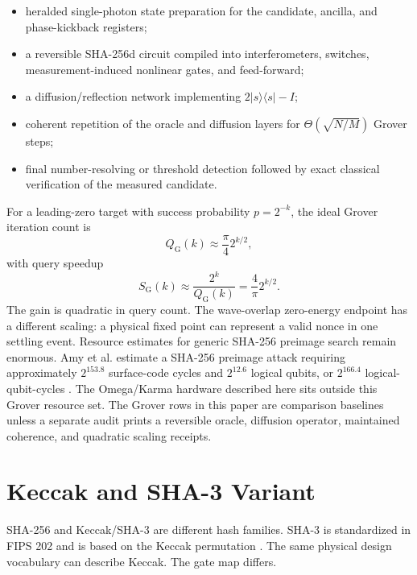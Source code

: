\documentclass[11pt]{article}
\theoremstyle{definition}
\theoremstyle{remark}
\begin{document}
\begin{itemize}
\item heralded single-photon state preparation for the candidate, ancilla, and
phase-kickback registers;
\item a reversible SHA-256d circuit compiled into interferometers, switches,
measurement-induced nonlinear gates, and feed-forward;
\item a diffusion/reflection network implementing \(2|s\rangle\langle s|-I\);
\item coherent repetition of the oracle and diffusion layers for
\(\Theta(\sqrt{N/M})\) Grover steps;
\item final number-resolving or threshold detection followed by exact classical
verification of the measured candidate.
\end{itemize}

For a leading-zero target with success probability \(p=2^{-k}\), the ideal
Grover iteration count is
\[
Q_{\mathrm{G}}(k)\approx \frac{\pi}{4}2^{k/2},
\]
with query speedup
\[
S_{\mathrm{G}}(k)\approx \frac{2^k}{Q_{\mathrm{G}}(k)}
=\frac{4}{\pi}2^{k/2}.
\]
The gain is quadratic in query count. The wave-overlap zero-energy endpoint has
a different scaling: a physical fixed point can represent a valid nonce in one
settling event. Resource estimates for generic SHA-256
preimage search remain enormous. Amy et al. estimate a SHA-256 preimage attack
requiring approximately \(2^{153.8}\) surface-code cycles and \(2^{12.6}\)
logical qubits, or \(2^{166.4}\) logical-qubit-cycles \cite{AmyEtAl2016}.
The Omega/Karma hardware described here sits outside this Grover resource set.
The Grover rows in this paper are comparison baselines unless a separate audit
prints a reversible oracle, diffusion operator, maintained coherence, and
quadratic scaling receipts.

\FloatBarrier
\section{Keccak and SHA-3 Variant}

SHA-256 and Keccak/SHA-3 are different hash families. SHA-3 is standardized in
FIPS 202 and is based on the Keccak permutation \cite{NISTFIPS202}. The same
physical design vocabulary can describe Keccak. The gate map differs.
\end{document}
